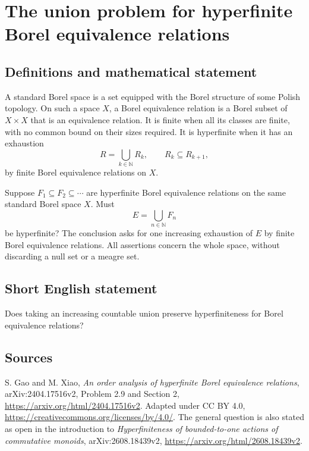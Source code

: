 \documentclass{article}
\begin{document}
\section*{The union problem for hyperfinite Borel equivalence relations}
\subsection{Definitions and mathematical statement}
A standard Borel space is a set equipped with the Borel structure of some
Polish topology. On such a space $X$, a Borel equivalence relation is a Borel
subset of $X\times X$ that is an equivalence relation. It is finite when all
its classes are finite, with no common bound on their sizes required.
It is hyperfinite when it has an exhaustion
\[
 R=\bigcup_{k\in\mathbb N}R_k,\qquad R_k\subseteq R_{k+1},
\]
by finite Borel equivalence relations on $X$.

Suppose $F_1\subseteq F_2\subseteq\cdots$ are hyperfinite Borel equivalence
relations on the same standard Borel space $X$. Must
\[
 E=\bigcup_{n\in\mathbb N}F_n
\]
be hyperfinite? The conclusion asks for one increasing exhaustion of $E$
by finite Borel equivalence relations. All assertions concern the whole
space, without discarding a null set or a meagre set.
\subsection{Short English statement}
Does taking an increasing countable union preserve hyperfiniteness for Borel equivalence relations?
\subsection{Sources}
S. Gao and M. Xiao, \emph{An order analysis of hyperfinite Borel equivalence
relations}, arXiv:2404.17516v2, Problem 2.9 and Section 2,
\url{https://arxiv.org/html/2404.17516v2}.
Adapted under CC BY 4.0, \url{https://creativecommons.org/licenses/by/4.0/}.
The general question is also stated as open in the introduction to
\emph{Hyperfiniteness of bounded-to-one actions of commutative monoids},
arXiv:2608.18439v2, \url{https://arxiv.org/html/2608.18439v2}.
\end{document}
